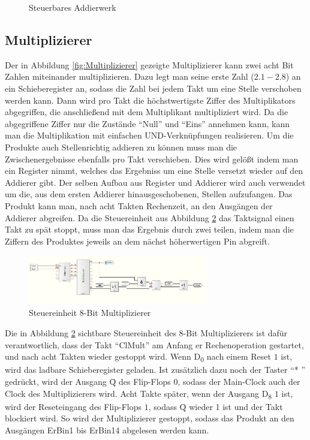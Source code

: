 \documentclass[a4paper,12pt,fleqn,oneside]{article}
\begin{document}
		\begin{figure}[h]
			\center
			
			\caption{Steuerbares Addierwerk}
			\label{fig:Addierwerk}
		\end{figure}
	\FloatBarrier



\newpage

	\subsection{Multiplizierer}
		Der in Abbildung \ref{fig:Multiplizierer} gezeigte Multiplizierer kann zwei acht Bit Zahlen miteinander multiplizieren. Dazu 
		legt man seine erste Zahl ($2.1 - 2.8$) an ein Schieberegister an, sodass die Zahl bei jedem Takt um eine Stelle verschoben 
		werden kann. Dann wird pro Takt die höchstwertigste Ziffer des Multiplikators abgegriffen, die anschließend mit dem 
		Multiplikant multipliziert wird. Da die abgegriffene Ziffer nur die Zustände  "`Null"' und  "`Eins"' annehmen kann, kann man 
		die Multiplikation mit einfachen UND-Verknüpfungen realisieren. Um die Produkte auch Stellenrichtig addieren zu können 
		muss man die Zwischenergebnisse ebenfalls pro Takt verschieben. Dies wird gelößt indem man ein Register nimmt, 
		welches das Ergebniss um eine Stelle versetzt wieder auf den Addierer gibt. Der selben Aufbau aus Register und Addierer 
		wird auch verwendet um die, aus dem ersten Addierer hinausgeschobenen, Stellen aufzufangen. Das Produkt kann man, 
		nach acht Takten Rechenzeit, an den Ausgängen der Addierer abgreifen. Da die Steuereinheit aus Abbildung 
		\ref{fig:Steuereinheit_Multiplizierer} das Taktsignal einen Takt zu spät stoppt, muss man das Ergebnis durch zwei teilen, 
		indem man die Ziffern des Produktes jeweils an dem nächst höherwertigen Pin abgreift.\\
		 
		
		\begin{figure}[h]
			\center
			\includegraphics[width=0.7\textwidth]{steuereinheit_multiplizierer}
			\caption{Steuereinheit 8-Bit Multiplizierer}
			\label{fig:Steuereinheit_Multiplizierer}
		\end{figure}

		Die in Abbildung \ref{fig:Steuereinheit_Multiplizierer} sichtbare Steuereinheit des 8-Bit Multiplizierers ist dafür 
		verantwortlich, dass der Takt "`ClMult"' am Anfang er Rechenoperation gestartet, und nach acht Takten wieder gestoppt 
		wird. Wenn D\textsubscript{0} nach einem Reset $1$ ist, wird das ladbare Schieberegister geladen. Ist zusätzlich dazu 
		noch der Taster "`* "' gedrückt, wird der Ausgang \={Q} des  Flip-Flops  $0$, sodass der Main-Clock auch der Clock des 
		Multiplizierers wird. Acht Takte später, wenn der Ausgang D\textsubscript{8} $1$ ist, wird der Reseteingang des Flip-Flops 
		$1$, sodass \={Q}  wieder 1 ist und der Takt blockiert wird. So wird der Multiplizierer gestoppt, sodass das Produkt an den
		Ausgängen ErBin1 bis ErBin14 abgelesen werden kann. 
\end{document}
